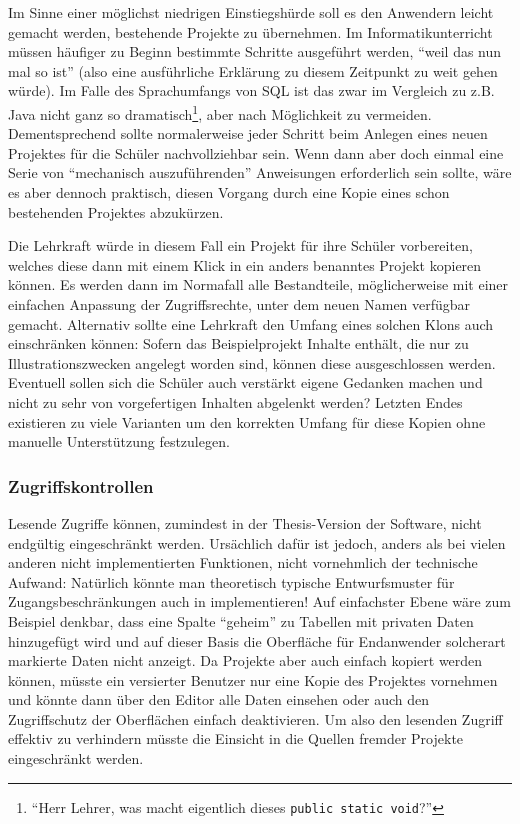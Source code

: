 Im Sinne einer möglichst niedrigen Einstiegshürde soll es den Anwendern leicht gemacht werden, bestehende Projekte zu übernehmen. Im Informatikunterricht müssen häufiger zu Beginn bestimmte Schritte ausgeführt werden, ``weil das nun mal so ist'' (also eine ausführliche Erklärung zu diesem Zeitpunkt zu weit gehen würde). Im Falle des Sprachumfangs von SQL ist das zwar im Vergleich zu z.B. Java nicht ganz so dramatisch\footnote{``Herr Lehrer, was macht eigentlich dieses \texttt{public static void}?''}, aber nach Möglichkeit zu vermeiden. Dementsprechend sollte normalerweise jeder Schritt beim Anlegen eines neuen Projektes für die Schüler nachvollziehbar sein. Wenn dann aber doch einmal eine Serie von ``mechanisch auszuführenden'' Anweisungen erforderlich sein sollte, wäre es aber dennoch praktisch, diesen Vorgang durch eine Kopie eines schon bestehenden Projektes abzukürzen.

Die Lehrkraft würde in diesem Fall ein Projekt für ihre Schüler vorbereiten, welches diese dann mit einem Klick in ein anders benanntes Projekt kopieren können. Es werden dann im Normafall alle Bestandteile, möglicherweise mit einer einfachen Anpassung der Zugriffsrechte, unter dem neuen Namen verfügbar gemacht. Alternativ sollte eine Lehrkraft den Umfang eines solchen Klons auch einschränken können: Sofern das Beispielprojekt Inhalte enthält, die nur zu Illustrationszwecken angelegt worden sind, können diese ausgeschlossen werden. Eventuell sollen sich die Schüler auch verstärkt eigene Gedanken machen und nicht zu sehr von vorgefertigen Inhalten abgelenkt werden? Letzten Endes existieren zu viele Varianten um den korrekten Umfang für diese Kopien ohne manuelle Unterstützung festzulegen.

\subsubsection{Zugriffskontrollen}
\label{sec:concept-access-control}

Lesende Zugriffe können, zumindest in der Thesis-Version der Software, nicht endgültig eingeschränkt werden. Ursächlich dafür ist jedoch, anders als bei vielen anderen nicht implementierten Funktionen, nicht vornehmlich der technische Aufwand: Natürlich könnte man theoretisch typische Entwurfsmuster für Zugangsbeschränkungen auch in \idename{} implementieren! Auf einfachster Ebene wäre zum Beispiel denkbar, dass eine Spalte "`geheim"' zu Tabellen mit privaten Daten hinzugefügt wird und auf dieser Basis die Oberfläche für Endanwender solcherart markierte Daten nicht anzeigt. Da Projekte aber auch einfach kopiert werden können, müsste ein versierter Benutzer nur eine Kopie des Projektes vornehmen und könnte dann über den Editor alle Daten einsehen oder auch den Zugriffschutz der Oberflächen einfach deaktivieren. Um also den lesenden Zugriff effektiv zu verhindern müsste die Einsicht in die Quellen fremder Projekte eingeschränkt werden.

